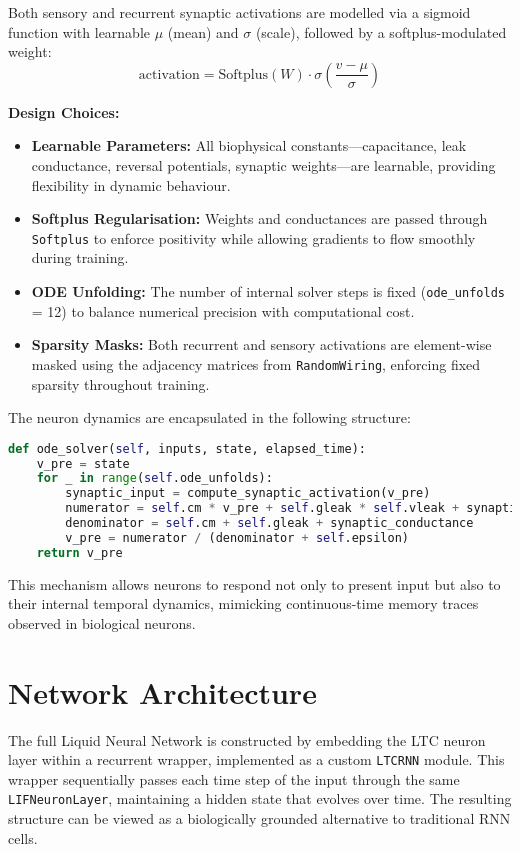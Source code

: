 \noindent Both sensory and recurrent synaptic activations are modelled via a sigmoid function with learnable $\mu$ (mean) and $\sigma$ (scale), followed by a softplus-modulated weight:
\[
\text{activation} = \text{Softplus}(W) \cdot \sigma\left( \frac{v - \mu}{\sigma} \right)
\]

\vspace{1em}
\noindent \textbf{Design Choices:}
\begin{itemize}
    \item \textbf{Learnable Parameters:} All biophysical constants—capacitance, leak conductance, reversal potentials, synaptic weights—are learnable, providing flexibility in dynamic behaviour.
    \item \textbf{Softplus Regularisation:} Weights and conductances are passed through \texttt{Softplus} to enforce positivity while allowing gradients to flow smoothly during training.
    \item \textbf{ODE Unfolding:} The number of internal solver steps is fixed (\texttt{ode\_unfolds} = 12) to balance numerical precision with computational cost.
    \item \textbf{Sparsity Masks:} Both recurrent and sensory activations are element-wise masked using the adjacency matrices from \texttt{RandomWiring}, enforcing fixed sparsity throughout training.
\end{itemize}

\noindent The neuron dynamics are encapsulated in the following structure:
\begin{lstlisting}[language=Python, caption={Simplified LTC neuron forward method}]
def ode_solver(self, inputs, state, elapsed_time):
    v_pre = state
    for _ in range(self.ode_unfolds):
        synaptic_input = compute_synaptic_activation(v_pre)
        numerator = self.cm * v_pre + self.gleak * self.vleak + synaptic_input
        denominator = self.cm + self.gleak + synaptic_conductance
        v_pre = numerator / (denominator + self.epsilon)
    return v_pre
\end{lstlisting}
This mechanism allows neurons to respond not only to present input but also to their internal temporal dynamics, mimicking continuous-time memory traces observed in biological neurons.

\section{Network Architecture}
The full Liquid Neural Network is constructed by embedding the LTC neuron layer within a recurrent wrapper, implemented as a custom \texttt{LTCRNN} module. This wrapper sequentially passes each time step of the input through the same \texttt{LIFNeuronLayer}, maintaining a hidden state that evolves over time. The resulting structure can be viewed as a biologically grounded alternative to traditional RNN cells.

